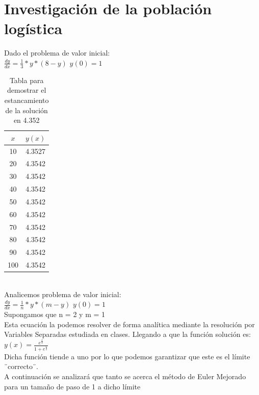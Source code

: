 \documentclass[12pt,a4paper]{article}
\begin{document}
            \section{Investigación de la población logística}
            Dado el problema de valor inicial:\\
            $\frac{d y}{d x} = \frac{1}{3} * y *(8-y) $\hspace*{1cm}
            $y(0) = 1$\hspace*{1cm}
            \begin{table}[ht]
\centering
\begin{tabular}{cc}
\toprule
\(x\) & \(y(x)\) \\
\midrule
10   & 4.3527 \\
20   & 4.3542 \\
30   & 4.3542 \\
40   & 4.3542 \\
50   & 4.3542 \\
60   & 4.3542 \\
70   & 4.3542 \\
80   & 4.3542 \\
90   & 4.3542 \\
100  & 4.3542 \\
\bottomrule
\end{tabular}
\caption{Tabla para demostrar el estancamiento de la solución en 4.352}
\label{tab:euler_mejorado}
\end{table}\\
Analicemos problema de valor inicial:\\
   $\frac{dy}{dx} = \frac{1}{n} * y * (m-y) $\hspace*{1cm}
   $y(0) = 1$\\
   \vspace{0.5cm}
   Supongamos que n = 2 y m = 1\\
   Esta ecuación la podemos resolver de forma analítica mediante la resolución
   por Variables Separadas estudiada en clases. Llegando a que la función solución es:\\
   $y(x) = \frac{e ^ \frac{x}{2} }{1 + e^\frac{x}{2} }$\\
   Dicha función tiende a uno por lo que podemos garantizar que este es
   el límite ¨correcto¨.\\
   A continuación se analizará que tanto se acerca el método de Euler Mejorado
   para un tamaño de paso de 1 a dicho límite
\end{document}
